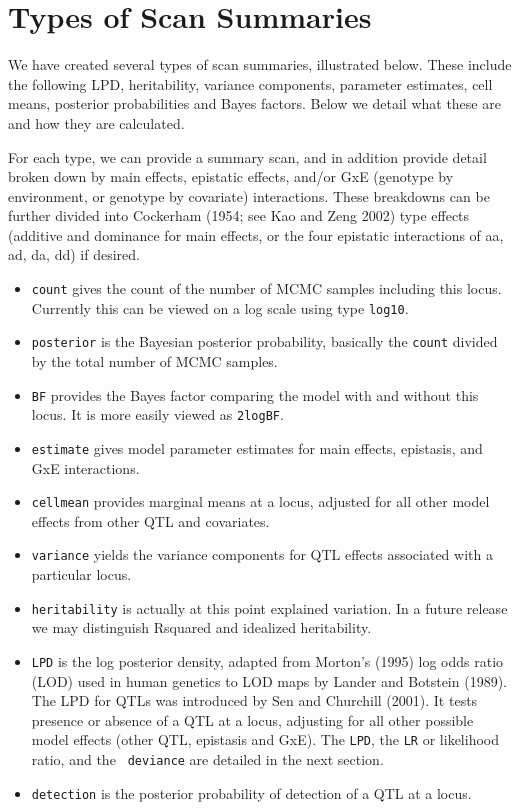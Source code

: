 \documentclass[12pt]{article}
\begin{document}
\section{Types of Scan Summaries}

We have created several types of scan summaries, illustrated
below. These include the following LPD, heritability, variance
components, parameter estimates, cell means, posterior probabilities
and Bayes factors. Below we detail what these are and how they are
calculated.

For each type, we can provide a summary scan, and in addition provide
detail broken down by main effects, epistatic effects, and/or GxE
(genotype by environment, or genotype by covariate)
interactions. These breakdowns can be further divided into Cockerham
(1954; see Kao and Zeng 2002) type effects (additive and dominance for
main effects, or the four epistatic interactions of aa, ad, da, dd) if
desired.

\begin{itemize}
\item
{\tt count} gives the count of the number of MCMC samples including
this locus. Currently this can be viewed on a log scale using type
{\tt log10}.
\item
{\tt posterior} is the Bayesian posterior probability, basically the
{\tt count} divided by the total number of MCMC samples.
\item
{\tt BF} provides the Bayes factor comparing the model with and
without this locus. It is more easily viewed as {\tt 2logBF}.
\item
{\tt estimate} gives model parameter estimates for main effects,
epistasis, and GxE interactions.
\item
{\tt cellmean} provides marginal means at a locus, adjusted for all
other model effects from other QTL and covariates.
\item
{\tt variance} yields the variance components for QTL effects
associated with a particular locus.
\item
{\tt heritability} is actually at this point explained variation. In a
future release we may distinguish Rsquared and idealized
heritability.
\item
{\tt LPD} is the log posterior density, adapted from Morton's (1995)
log odds ratio (LOD) used in human genetics to LOD maps by Lander and
Botstein (1989). The LPD for QTLs was introduced by Sen and Churchill
(2001). It tests presence or absence of a QTL at a locus, adjusting
for all other possible model effects (other QTL, epistasis and
GxE). The {\tt LPD}, the {\tt LR} or likelihood ratio, and the {\tt
deviance} are detailed in the next section.
\item
{\tt detection} is the posterior probability of detection of a QTL at
a locus.
\end{itemize}
\end{document}
